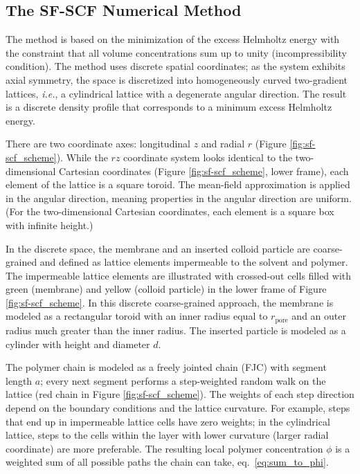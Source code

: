 \documentclass[10pt, a4paper]{article}
\begin{document}
\subsection*{The SF-SCF Numerical Method}
\begin{multicols}{2}

The method is based on the minimization of the excess Helmholtz energy with the constraint that all volume concentrations sum up to unity (incompressibility condition).
The method uses discrete spatial coordinates; as the system exhibits axial symmetry, the space is discretized into homogeneously curved two-gradient lattices, \emph{i.e.}, a cylindrical lattice with a degenerate angular direction.
The result is a discrete density profile that corresponds to a minimum excess Helmholtz energy.

There are two coordinate axes: longitudinal $z$ and radial $r$ (Figure \ref{fig:sf-scf_scheme}).
While the $rz$ coordinate system looks identical to the two-dimensional Cartesian coordinates (Figure \ref{fig:sf-scf_scheme}, lower frame), each element of the lattice is a square toroid.
The mean-field approximation is applied in the angular direction, meaning properties in the angular direction are uniform.
(For the two-dimensional Cartesian coordinates, each element is a square box with infinite height.)

In the discrete space, the membrane and an inserted colloid particle are coarse-grained and defined as lattice elements impermeable to the solvent and polymer.
The impermeable lattice elements are illustrated with crossed-out cells filled with green (membrane) and yellow (colloid particle) in the lower frame of Figure \ref{fig:sf-scf_scheme}.
In this discrete coarse-grained approach, the membrane is modeled as a rectangular toroid with an inner radius equal to $r_{\textrm{pore}}$ and an outer radius much greater than the inner radius.
The inserted particle is modeled as a cylinder with height and diameter $d$.

The polymer chain is modeled as a freely jointed chain (FJC) with segment length $a$; every next segment performs a step-weighted random walk on the lattice (red chain in Figure \ref{fig:sf-scf_scheme}).
The weights of each step direction depend on the boundary conditions and the lattice curvature.
For example, steps that end up in impermeable lattice cells have zero weights; in the cylindrical lattice, steps to the cells within the layer with lower curvature (larger radial coordinate) are more preferable.
The resulting local polymer concentration $\phi$ is a weighted sum of all possible paths the chain can take, eq.~\ref{eq:sum_to_phi}.


\end{multicols}
\end{document}
